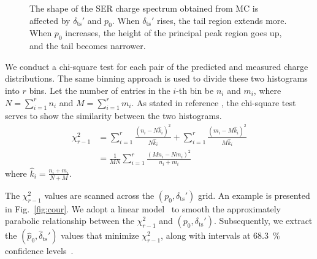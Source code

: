 \begin{figure}[!htbp]
\begin{subfigure}{0.5\textwidth}
		\caption{}
		\label{fig:ts}
	\end{subfigure}
	\caption{The shape of the SER charge spectrum obtained from MC is affected by $\delta_{\mathrm{ts}}'$ and $p_0$. When $\delta_{\mathrm{ts}}'$ rises, the tail region extends more. When $p_0$ increases, the height of the principal peak region goes up, and the tail becomes  narrower.
	}
	\label{fig:tsp}
\end{figure}

We conduct a chi-square test for each pair of the predicted and measured charge distributions. The same binning approach is used to divide these two histograms into \(r\) bins. Let the number of entries in the \(i\)-th bin be \(n_i\) and \(m_{i}\), where \(N=\sum_{i = 1}^{r}n_{i}\) and \(M=\sum_{i = 1}^{r}m_{i}\). As stated in reference \cite{2006Comparison}, the chi-square test serves to show the similarity between the two histograms.
\begin{equation}
	\label{eq:chi}
	\begin{aligned}
		\chi^2_{r-1} & =\sum_{{i}=1}^r \frac{\left(n_{i}-N \hat{k}_{i}\right)^2}{N \hat{k}_{i}}+\sum_{{i}=1}^r\frac{\left(m_{i}-M \hat{k}_{i}\right)^2}{M \hat{k}_{i}} \\
		             & =\frac{1}{M N} \sum_{{i}=1}^r\frac{\left(M n_{i}-N m_{i}\right)^2}{n_{i}+m_{i}}
	\end{aligned}
\end{equation}
where \(\hat{k}_{i}=\frac{n_{i}+m_{i}}{N+M}\).

The \(\chi^2_{r - 1}\) values are scanned across the \((p_0,\delta_{\mathrm{ts}}')\) grid. An example is presented in Fig.~\ref{fig:cour}. We adopt a linear model~\cite{Gelman_Hill_2006} to smooth the approximately parabolic relationship between the \(\chi^2_{r - 1}\) and \((p_0, \delta_{\mathrm{ts}}')\). Subsequently, we extract the \((\hat{p}_0, \hat{\delta}_{\mathrm{ts}}')\) values that minimize \(\chi^2_{r - 1}\), along with intervals at \SI{68.3}{\percent} confidence levels~\cite{cowan1997statistical}.

